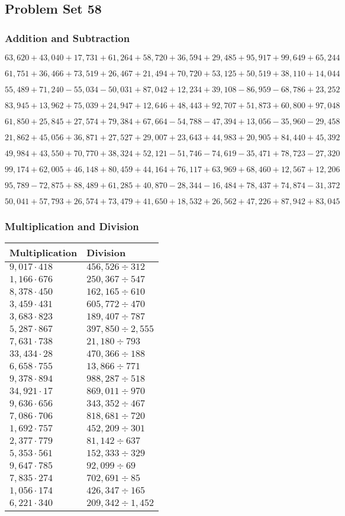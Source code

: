 \hypertarget{problem-set-58-3}{%
\subsection{Problem Set 58}\label{problem-set-58-3}}

\hypertarget{addition-and-subtraction-280}{%
\subsubsection{Addition and
Subtraction}\label{addition-and-subtraction-280}}

\(63,620+43,040+17,731+61,264+58,720+36,594+29,485+95,917+99,649+ 65,244\)

\(61,751+36,466+73,519+26,467+21,494+70,720+53,125+50,519+38,110+14,044\)

\(55,489+71,240-55,034-50,031+87,042+12,234+39,108-86,959-68,786+23,252\)

\(83,945+13,962+75,039+24,947+12,646+48,443+92,707+51,873+60,800+97,048\)

\(61,850+25,845+27,574+79,384+67,664-54,788-47,394+13,056-35,960-29,458\)

\(21,862+45,056+36,871+27,527+29,007+23,643+44,983+20,905+84,440+45,392\)

\(49,984+43,550+70,770+38,324+52,121-51,746-74,619-35,471+78,723-27,320\)

\(99,174+62,005+46,148+80,459+44,164+76,117+63,969+68,460+12,567+12,206\)

\(95,789-72,875+88,489+61,285+40,870-28,344-16,484+78,437+74,874-31,372\)

\(50,041+57,793+26,574+73,479+41,650+18,532+26,562+47,226+87,942+83,045\)

\hypertarget{multiplication-and-division-279}{%
\subsubsection{Multiplication and
Division}\label{multiplication-and-division-279}}

\begin{longtable}[]{@{}ll@{}}
\toprule
Multiplication & Division\tabularnewline
\midrule
\endhead
\(9,017\cdot418\) & \(456,526 ÷312\)\tabularnewline
\(1,166\cdot676\) & \(250,367÷547\)\tabularnewline
\(8,378\cdot450\) & \(162,165÷610\)\tabularnewline
\(3,459\cdot431\) & \(605,772÷470\)\tabularnewline
\(3,683\cdot823\) & \(189,407÷787\)\tabularnewline
\(5,287\cdot867\) & \(397,850÷2,555\)\tabularnewline
\(7,631\cdot738\) & \(21,180÷793\)\tabularnewline
\(33,434\cdot28\) & \(470,366÷188\)\tabularnewline
\(6,658\cdot755\) & \(13,866÷771\)\tabularnewline
\(9,378\cdot894\) & \(988,287÷518\)\tabularnewline
\(34,921\cdot17\) & \(869,011÷970\)\tabularnewline
\(9,636\cdot656\) & \(343,352÷467\)\tabularnewline
\(7,086\cdot706\) & \(818,681÷720\)\tabularnewline
\(1,692\cdot757\) & \(452,209÷301\)\tabularnewline
\(2,377\cdot779\) & \(81,142÷637\)\tabularnewline
\(5,353\cdot561\) & \(152,333÷329\)\tabularnewline
\(9,647\cdot785\) & \(92,099÷69\)\tabularnewline
\(7,835\cdot274\) & \(702,691÷85\)\tabularnewline
\(1,056\cdot174\) & \(426,347÷165\)\tabularnewline
\(6,221\cdot340\) & \(209,342÷1,452\)\tabularnewline
\bottomrule
\end{longtable}

